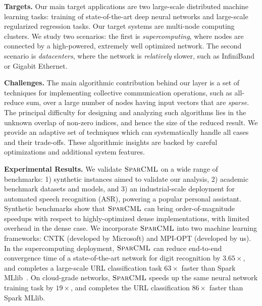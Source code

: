 \documentclass[11pt]{article}
\renewcommand{\paragraph}[1]{\vspace{0.1em} \noindent \textbf{#1}}
\newcommand{\mml}{$\textsc{SparCML}$}
\begin{document}
\paragraph{Targets.} Our main target applications are two large-scale distributed machine learning tasks: training of state-of-the-art deep neural networks and large-scale regularized regression tasks. 
Our target systems are multi-node computing clusters. We study two scenarios: the first is \emph{supercomputing}, where nodes are connected by a high-powered, extremely well optimized network.
The second scenario is \emph{datacenters}, where the network is \emph{relatively} slower, such as InfiniBand or Gigabit Ethernet.

\paragraph{Challenges.} The main algorithmic contribution behind our layer is a set of techniques for implementing collective communication operations, such as all-reduce sum, over a large number of nodes having input vectors that are \emph{sparse}. 
The principal difficulty for designing and analyzing such algorithms lies in the unknown overlap of non-zero indices, and hence the size of the reduced result. 
We provide an adaptive set of techniques which can systematically handle all cases and their trade-offs.
These algorithmic insights are backed by careful optimizations and additional system features. 

\paragraph{Experimental Results.} 
We validate \mml{} on a wide range of benchmarks: 1) synthetic instances aimed to validate our analysis, 2) academic benchmark datasets and models, and 3) an industrial-scale deployment for automated speech recognition (ASR), powering a popular personal assistant. 
Synthetic benchmarks show that \mml{} can bring order-of-magnitude speedups with respect to highly-optimized dense implementations, with limited overhead in the dense case. 
We incorporate \mml{} into two machine learning frameworks: CNTK (developed by Microsoft) and MPI-OPT (developed by us). In the supercomputing deployment, \mml{} can reduce end-to-end convergence time of a state-of-the-art network for digit recognition by $3.65\times$, and completes a large-scale URL classification task $63\times$ faster than Spark MLlib~\cite{Spark}. 
On cloud-grade networks, \mml{} speeds up the same neural network training task by $19\times$, and completes the URL classification $86\times$ faster than Spark MLlib. 
\end{document}
